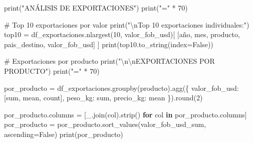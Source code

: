 \documentclass[
  doc,
  floatsintext,
  longtable,
  a4paper,
  nolmodern,
  notxfonts,
  notimes,
  12pt,
  colorlinks=true,linkcolor=blue,citecolor=blue,urlcolor=blue]{apa7}
\newenvironment{Shaded}{\begin{snugshade}}{\end{snugshade}}
\newcommand{\BuiltInTok}[1]{\textcolor[rgb]{0.00,0.23,0.31}{#1}}
\newcommand{\CharTok}[1]{\textcolor[rgb]{0.13,0.47,0.30}{#1}}
\newcommand{\CommentTok}[1]{\textcolor[rgb]{0.37,0.37,0.37}{#1}}
\newcommand{\ControlFlowTok}[1]{\textcolor[rgb]{0.00,0.23,0.31}{\textbf{#1}}}
\newcommand{\DecValTok}[1]{\textcolor[rgb]{0.68,0.00,0.00}{#1}}
\newcommand{\KeywordTok}[1]{\textcolor[rgb]{0.00,0.23,0.31}{\textbf{#1}}}
\newcommand{\NormalTok}[1]{\textcolor[rgb]{0.00,0.23,0.31}{#1}}
\newcommand{\OperatorTok}[1]{\textcolor[rgb]{0.37,0.37,0.37}{#1}}
\newcommand{\StringTok}[1]{\textcolor[rgb]{0.13,0.47,0.30}{#1}}
\newcommand{\VariableTok}[1]{\textcolor[rgb]{0.07,0.07,0.07}{#1}}
\begin{document}
\begin{Shaded}
\begin{Highlighting}[]
\BuiltInTok{print}\NormalTok{(}\StringTok{"ANÁLISIS DE EXPORTACIONES"}\NormalTok{)}
\BuiltInTok{print}\NormalTok{(}\StringTok{"="} \OperatorTok{*} \DecValTok{70}\NormalTok{)}

\CommentTok{\# Top 10 exportaciones por valor}
\BuiltInTok{print}\NormalTok{(}\StringTok{"}\CharTok{\textbackslash{}n}\StringTok{Top 10 exportaciones individuales:"}\NormalTok{)}
\NormalTok{top10 }\OperatorTok{=}\NormalTok{ df\_exportaciones.nlargest(}\DecValTok{10}\NormalTok{, }\StringTok{\textquotesingle{}valor\_fob\_usd\textquotesingle{}}\NormalTok{)[}
\NormalTok{    [}\StringTok{\textquotesingle{}año\textquotesingle{}}\NormalTok{, }\StringTok{\textquotesingle{}mes\textquotesingle{}}\NormalTok{, }\StringTok{\textquotesingle{}producto\textquotesingle{}}\NormalTok{, }\StringTok{\textquotesingle{}pais\_destino\textquotesingle{}}\NormalTok{, }\StringTok{\textquotesingle{}valor\_fob\_usd\textquotesingle{}}\NormalTok{]}
\NormalTok{]}
\BuiltInTok{print}\NormalTok{(top10.to\_string(index}\OperatorTok{=}\VariableTok{False}\NormalTok{))}

\CommentTok{\# Exportaciones por producto}
\BuiltInTok{print}\NormalTok{(}\StringTok{"}\CharTok{\textbackslash{}n\textbackslash{}n}\StringTok{EXPORTACIONES POR PRODUCTO"}\NormalTok{)}
\BuiltInTok{print}\NormalTok{(}\StringTok{"="} \OperatorTok{*} \DecValTok{70}\NormalTok{)}

\NormalTok{por\_producto }\OperatorTok{=}\NormalTok{ df\_exportaciones.groupby(}\StringTok{\textquotesingle{}producto\textquotesingle{}}\NormalTok{).agg(\{}
    \StringTok{\textquotesingle{}valor\_fob\_usd\textquotesingle{}}\NormalTok{: [}\StringTok{\textquotesingle{}sum\textquotesingle{}}\NormalTok{, }\StringTok{\textquotesingle{}mean\textquotesingle{}}\NormalTok{, }\StringTok{\textquotesingle{}count\textquotesingle{}}\NormalTok{],}
    \StringTok{\textquotesingle{}peso\_kg\textquotesingle{}}\NormalTok{: }\StringTok{\textquotesingle{}sum\textquotesingle{}}\NormalTok{,}
    \StringTok{\textquotesingle{}precio\_kg\textquotesingle{}}\NormalTok{: }\StringTok{\textquotesingle{}mean\textquotesingle{}}
\NormalTok{\}).}\BuiltInTok{round}\NormalTok{(}\DecValTok{2}\NormalTok{)}

\NormalTok{por\_producto.columns }\OperatorTok{=}\NormalTok{ [}\StringTok{\textquotesingle{}\_\textquotesingle{}}\NormalTok{.join(col).strip() }\ControlFlowTok{for}\NormalTok{ col }\KeywordTok{in}\NormalTok{ por\_producto.columns]}
\NormalTok{por\_producto }\OperatorTok{=}\NormalTok{ por\_producto.sort\_values(}\StringTok{\textquotesingle{}valor\_fob\_usd\_sum\textquotesingle{}}\NormalTok{, ascending}\OperatorTok{=}\VariableTok{False}\NormalTok{)}
\BuiltInTok{print}\NormalTok{(por\_producto)}


\end{Highlighting}
\end{Shaded}
\end{document}
